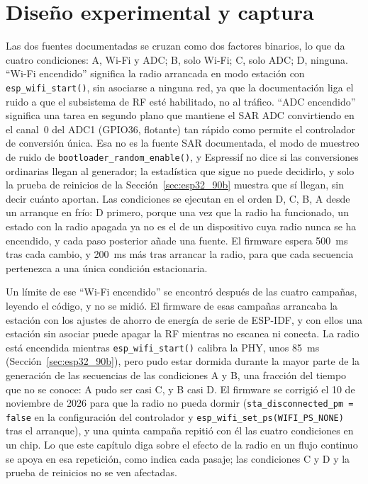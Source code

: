 \section{Diseño experimental y captura}
\label{sec:esp32_setup}

Las dos fuentes documentadas se cruzan como dos factores binarios, lo que
da cuatro condiciones: A, Wi-Fi y ADC; B, solo Wi-Fi; C, solo ADC; D,
ninguna. ``Wi-Fi encendido'' significa la radio arrancada en modo
estación con \texttt{esp\_wifi\_start()}, sin asociarse a ninguna red, ya
que la documentación liga el ruido a que el subsistema de RF esté
habilitado, no al tráfico. ``ADC encendido'' significa una tarea en
segundo plano que mantiene el SAR ADC convirtiendo en el canal~0 del ADC1
(GPIO36, flotante) tan rápido como permite el controlador de conversión
única. Esa no es la fuente SAR documentada, el modo de muestreo de ruido
de \texttt{bootloader\_random\_enable()}, y Espressif no dice si las
conversiones ordinarias llegan al generador; la estadística que sigue no
puede decidirlo, y solo la prueba de reinicios de la
Sección~\ref{sec:esp32_90b} muestra que sí llegan, sin decir cuánto
aportan. Las condiciones se ejecutan en el
orden D, C, B, A desde un arranque en frío: D primero, porque una vez que
la radio ha funcionado, un estado con la radio apagada ya no es el de un
dispositivo cuya radio nunca se ha encendido, y cada paso posterior añade
una fuente. El firmware espera 500~ms tras cada cambio, y 200~ms más tras
arrancar la radio, para que cada secuencia pertenezca a una única
condición estacionaria.

Un límite de ese ``Wi-Fi encendido'' se encontró después de las cuatro
campañas, leyendo el código, y no se midió. El firmware de esas campañas
arrancaba la estación con los ajustes de ahorro de energía de serie de
ESP-IDF, y con ellos una estación sin asociar puede apagar la RF mientras
no escanea ni conecta. La radio está encendida mientras
\texttt{esp\_wifi\_start()} calibra la PHY, unos 85~ms
(Sección~\ref{sec:esp32_90b}), pero pudo estar dormida durante la mayor
parte de la generación de las secuencias de las condiciones A y B, una
fracción del tiempo que no se conoce: A pudo ser casi C, y B casi D. El
firmware se corrigió el 10 de noviembre de 2026 para que la radio no
pueda dormir (\texttt{sta\_disconnected\_pm = false} en la configuración
del controlador y \texttt{esp\_wifi\_set\_ps(WIFI\_PS\_NONE)} tras el
arranque), y una quinta campaña repitió con él las cuatro condiciones en
un chip. Lo que este capítulo diga sobre el efecto de la radio en un
flujo continuo se apoya en esa repetición, como indica cada pasaje; las
condiciones C y D y la prueba de reinicios no se ven afectadas.

